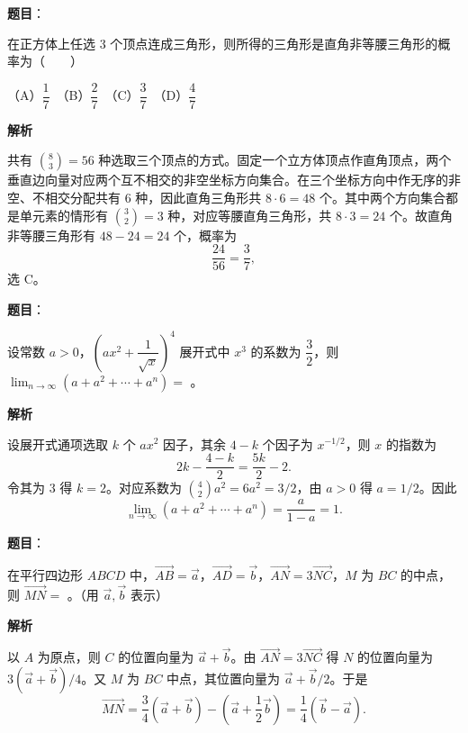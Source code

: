 \begin{answer}

\textbf{题目}：

在正方体上任选 3 个顶点连成三角形，则所得的三角形是直角非等腰三角形的概率为\mbox{（　　）}

（A）$\dfrac17$　（B）$\dfrac27$　（C）$\dfrac37$　（D）$\dfrac47$

\textbf{解析}

共有 $\binom83=56$ 种选取三个顶点的方式。固定一个立方体顶点作直角顶点，两个垂直边向量对应两个互不相交的非空坐标方向集合。在三个坐标方向中作无序的非空、不相交分配共有 $6$ 种，因此直角三角形共 $8\cdot6=48$ 个。其中两个方向集合都是单元素的情形有 $\binom32=3$ 种，对应等腰直角三角形，共 $8\cdot3=24$ 个。故直角非等腰三角形有 $48-24=24$ 个，概率为
\nopagebreak[4]
\[
\frac{24}{56}=\frac37,
\]
选 C。


\end{answer}
\begin{answer}

\textbf{题目}：

设常数 $a>0$，$(ax^2+\dfrac{1}{\sqrt{x}})^4$ 展开式中 $x^3$ 的系数为 $\dfrac32$，则 $\displaystyle\lim_{n\to\infty}(a+a^2+\cdots+a^n)=$ \gkblank{}。

\textbf{解析}

设展开式通项选取 $k$ 个 $ax^2$ 因子，其余 $4-k$ 个因子为 $x^{-1/2}$，则 $x$ 的指数为
\nopagebreak[4]
\[
2k-\frac{4-k}{2}=\frac{5k}{2}-2.
\]
令其为 $3$ 得 $k=2$。对应系数为 $\binom42a^2=6a^2=3/2$，由 $a>0$ 得 $a=1/2$。因此
\nopagebreak[4]
\[
\lim_{n\to\infty}(a+a^2+\cdots+a^n)
=\frac{a}{1-a}=1.
\]


\end{answer}
\begin{answer}

\textbf{题目}：

在平行四边形 $ABCD$ 中，$\overrightarrow{AB}=\vec a$，$\overrightarrow{AD}=\vec b$，$\overrightarrow{AN}=3\overrightarrow{NC}$，$M$ 为 $BC$ 的中点，则 $\overrightarrow{MN}=$ \gkblank{}。（用 $\vec a,\vec b$ 表示）

\textbf{解析}

以 $A$ 为原点，则 $C$ 的位置向量为 $\vec a+\vec b$。由 $\overrightarrow{AN}=3\overrightarrow{NC}$ 得 $N$ 的位置向量为 $3(\vec a+\vec b)/4$。又 $M$ 为 $BC$ 中点，其位置向量为 $\vec a+\vec b/2$。于是
\nopagebreak[4]
\[
\overrightarrow{MN}
=\frac34(\vec a+\vec b)-\left(\vec a+\frac12\vec b\right)
=\frac14(\vec b-\vec a).
\]


\end{answer}

